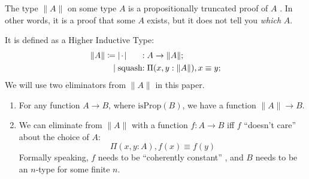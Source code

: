 \begin{definition} \label{prop-trunc}
  The type \(\lVert A \rVert\) on some type \(A\) is a propositionally truncated
  proof of \(A\) \cite[3.7]{hottbook}.
  In other words, it is a proof that some \(A\) exists, but it does not tell you
  \emph{which} \(A\).

  It is defined as a Higher Inductive Type:
  \begin{equation} {
    \begin{alignedat}{3}
      \lVert A \rVert \coloneqq & \; \lvert {\mkern 2mu\cdot\mkern 2mu}\rvert &:& \; A \rightarrow \lVert A \rVert ; \\
                              | & \; \text{squash}     &:& \; \Pi {(x, y : \lVert A \rVert)} , x \equiv y  ; 
    \end{alignedat} }
  \end{equation}
  We will use two eliminators from \(\lVert A \rVert\) in this paper.
  \begin{enumerate}
  \item \label{elim-prop-prop} For any function \(A \rightarrow B\), where
    \(\text{isProp}(B)\), we have a function \(\lVert A \rVert \rightarrow B\).
  \item \label{elim-prop-coh} We can eliminate from \(\lVert A \rVert\) with a
    function \(f : A \rightarrow B\) iff \(f\) ``doesn't care'' about the
    choice of \(A\):
    \[\Pi {(x , y : A)} , f(x) \equiv f(y) \]
    Formally speaking, \(f\) needs to be ``coherently constant''
    \cite{krausGeneralUniversalProperty2015}, and \(B\) needs to be an
    \(n\)-type for some finite \(n\).
  \end{enumerate}
\end{definition}

